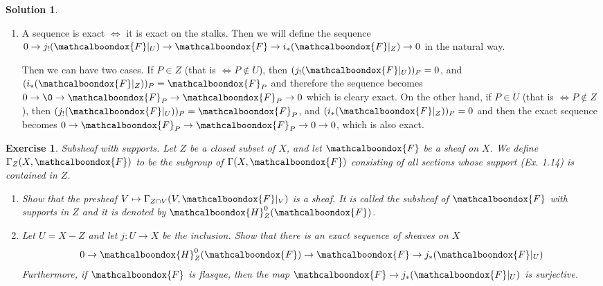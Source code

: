 \documentclass[12pt]{article}
\newtheorem{ex}{Exercise}[section]
\theoremstyle{definition}
\newtheorem*{sol}{Solution}
\newcommand{\sF}{\ensuremath{\mathcalboondox{F}}}
\newcommand{\sH}{\ensuremath{\mathcalboondox{H}}}
\begin{document}
\begin{sol}
\begin{enumerate}[label=\alph*)]
		\item A sequence is exact $\iff$ it is exact on the stalks. Then we will define the sequence $0 \to j_{!}(\sF|_{U}) \to \sF \to i_{*}(\sF|_{Z}) \to 0$ in the natural way.


		Then we can have two cases. If $P \in Z$ (that is $\iff P \notin U$), then $(j_{!}(\sF|_U))_P = 0$, and $(i_{*}(\sF|_Z))_P = \sF_P$ and therefore the sequence becomes $0 \to \0 \to \sF_P \to \sF_P \to 0$ which is cleary exact. On the other hand, if $P \in U$ (that is $\iff P \notin Z$), then $(j_{!}(\sF|_U))_P = \sF_P$, and $(i_{*}(\sF|_Z))_P = 0$ and then the exact sequence becomes $0 \to \sF_P \to \sF_P \to 0 \to 0$, which is also exact.

	\end{enumerate}

\end{sol}

\begin{ex}
	Subsheaf with supports. Let $Z$ be a closed subset of $X$, and let $\sF$ be a sheaf on $X$. We define $\Gamma_Z(X, \sF)$ to be the subgroup of $\Gamma(X,\sF)$ consisting of all sections whose support (Ex. 1.14) is contained in $Z$.
	\begin{enumerate}[label=\alph*)]
		\item Show that the presheaf $V \mapsto \Gamma_{Z \cap V}(V, \sF|_V)$ is a sheaf. It is called the subsheaf of $\sF$ with supports in $Z$ and it is denoted by $\sH^{0}_Z(\sF)$.

		\item Let $U = X-Z$ and let $j: U \to X$ be the inclusion. Show that there is an exact sequence of sheaves on $X$
		\[
		 0 \to \sH^{0}_Z(\sF) \to \sF \to j_{*}(\sF|_U)
		\]
		Furthermore, if $\sF$ is flasque, then the map $\sF \to j_{*}(\sF|_U)$ is surjective.
	\end{enumerate}
\end{ex}
\end{document}

